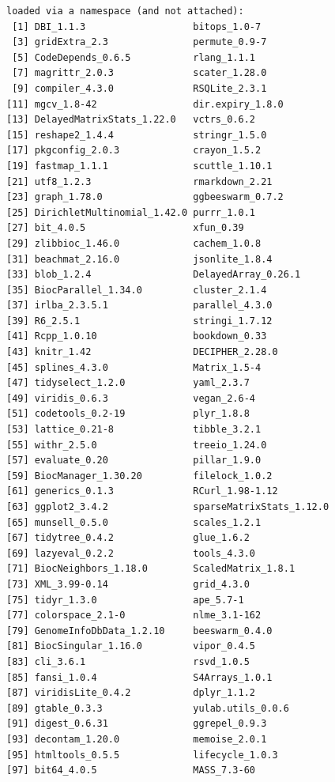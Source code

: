 \documentclass[
]{book}
\begin{document}
\begin{verbatim}
loaded via a namespace (and not attached):
 [1] DBI_1.1.3                   bitops_1.0-7               
 [3] gridExtra_2.3               permute_0.9-7              
 [5] CodeDepends_0.6.5           rlang_1.1.1                
 [7] magrittr_2.0.3              scater_1.28.0              
 [9] compiler_4.3.0              RSQLite_2.3.1              
[11] mgcv_1.8-42                 dir.expiry_1.8.0           
[13] DelayedMatrixStats_1.22.0   vctrs_0.6.2                
[15] reshape2_1.4.4              stringr_1.5.0              
[17] pkgconfig_2.0.3             crayon_1.5.2               
[19] fastmap_1.1.1               scuttle_1.10.1             
[21] utf8_1.2.3                  rmarkdown_2.21             
[23] graph_1.78.0                ggbeeswarm_0.7.2           
[25] DirichletMultinomial_1.42.0 purrr_1.0.1                
[27] bit_4.0.5                   xfun_0.39                  
[29] zlibbioc_1.46.0             cachem_1.0.8               
[31] beachmat_2.16.0             jsonlite_1.8.4             
[33] blob_1.2.4                  DelayedArray_0.26.1        
[35] BiocParallel_1.34.0         cluster_2.1.4              
[37] irlba_2.3.5.1               parallel_4.3.0             
[39] R6_2.5.1                    stringi_1.7.12             
[41] Rcpp_1.0.10                 bookdown_0.33              
[43] knitr_1.42                  DECIPHER_2.28.0            
[45] splines_4.3.0               Matrix_1.5-4               
[47] tidyselect_1.2.0            yaml_2.3.7                 
[49] viridis_0.6.3               vegan_2.6-4                
[51] codetools_0.2-19            plyr_1.8.8                 
[53] lattice_0.21-8              tibble_3.2.1               
[55] withr_2.5.0                 treeio_1.24.0              
[57] evaluate_0.20               pillar_1.9.0               
[59] BiocManager_1.30.20         filelock_1.0.2             
[61] generics_0.1.3              RCurl_1.98-1.12            
[63] ggplot2_3.4.2               sparseMatrixStats_1.12.0   
[65] munsell_0.5.0               scales_1.2.1               
[67] tidytree_0.4.2              glue_1.6.2                 
[69] lazyeval_0.2.2              tools_4.3.0                
[71] BiocNeighbors_1.18.0        ScaledMatrix_1.8.1         
[73] XML_3.99-0.14               grid_4.3.0                 
[75] tidyr_1.3.0                 ape_5.7-1                  
[77] colorspace_2.1-0            nlme_3.1-162               
[79] GenomeInfoDbData_1.2.10     beeswarm_0.4.0             
[81] BiocSingular_1.16.0         vipor_0.4.5                
[83] cli_3.6.1                   rsvd_1.0.5                 
[85] fansi_1.0.4                 S4Arrays_1.0.1             
[87] viridisLite_0.4.2           dplyr_1.1.2                
[89] gtable_0.3.3                yulab.utils_0.0.6          
[91] digest_0.6.31               ggrepel_0.9.3              
[93] decontam_1.20.0             memoise_2.0.1              
[95] htmltools_0.5.5             lifecycle_1.0.3            
[97] bit64_4.0.5                 MASS_7.3-60                
\end{verbatim}
\end{document}
